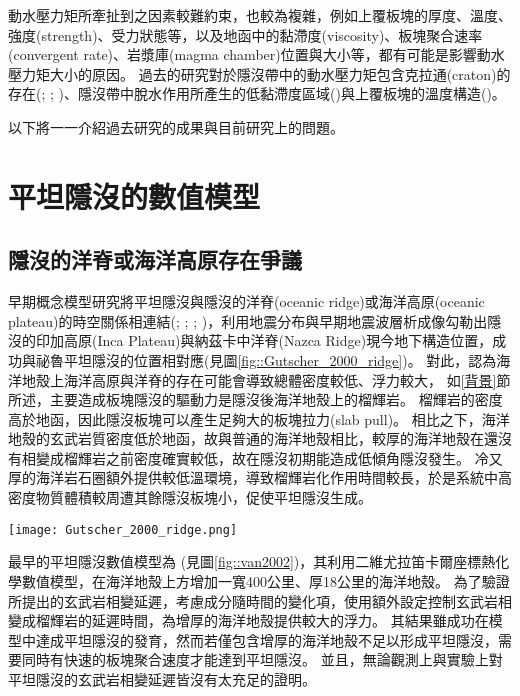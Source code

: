 動水壓力矩所牽扯到之因素較難約束，也較為複雜，例如上覆板塊的厚度、溫度、強度(strength)、受力狀態等，以及地函中的黏滯度(viscosity)、板塊聚合速率(convergent rate)、岩漿庫(magma chamber)位置與大小等，都有可能是影響動水壓力矩大小的原因。
過去的研究對於隱沒帶中的動水壓力矩包含克拉通(craton)的存在(\citealp{Manea2012Chile}; \citealp{Liu2016}; \citealp{Hu2016})、隱沒帶中脫水作用所產生的低黏滯度區域(\citealp{Manea2007})與上覆板塊的溫度構造(\citealp{Thermal2012})。

以下將一一介紹過去研究的成果與目前研究上的問題。

\section{平坦隱沒的數值模型}\label{平坦隱沒的數值模型}
\subsection{隱沒的洋脊或海洋高原存在爭議}\label{隱沒的洋脊或海洋高原存在爭議}
早期概念模型研究將平坦隱沒與隱沒的洋脊(oceanic ridge)或海洋高原(oceanic plateau)的時空關係相連結(\citealp{pilger1981plate}; \citealp{henderson1984mesozoic}; \citealp{Gutscher2000A}; \citealp{gutscher2002andean})，\citealp{Gutscher2000A}利用地震分布與早期地震波層析成像勾勒出隱沒的印加高原(Inca Plateau)與納茲卡中洋脊(Nazca Ridge)現今地下構造位置，成功與祕魯平坦隱沒的位置相對應(見圖\ref{fig::Gutscher_2000_ridge})。
對此，\citealp{Gutscher2000A}認為海洋地殼上海洋高原與洋脊的存在可能會導致總體密度較低、浮力較大，
如\ref{背景}節所述，主要造成板塊隱沒的驅動力是隱沒後海洋地殼上的榴輝岩。
榴輝岩的密度高於地函，因此隱沒板塊可以產生足夠大的板塊拉力(slab pull)。
相比之下，海洋地殼的玄武岩質密度低於地函，故與普通的海洋地殼相比，較厚的海洋地殼在還沒有相變成榴輝岩之前密度確實較低，故在隱沒初期能造成低傾角隱沒發生。
冷又厚的海洋岩石圈額外提供較低溫環境，導致榴輝岩化作用時間較長，於是系統中高密度物質體積較周遭其餘隱沒板塊小，促使平坦隱沒生成。

\begin{figure*}[htp]
    \centering
    \texttt{[image: Gutscher\_2000\_ridge.png]}
    \caption[南美洲板塊構造圖，摘自\citealp{Gutscher2000A}]{南美洲板塊構造圖，摘自\citealp{Gutscher2000A}。粗黑線標出平坦隱沒段，灰色陰影區標示隱沒的海洋高原與洋脊，三角形為活動火山。板塊聚合速率由白色箭頭標出，數值參考自\citealp{demets1990current}。
    }
    \label{fig::Gutscher_2000_ridge}
\end{figure*}

最早的平坦隱沒數值模型為\citealp{van2002role} (見圖\ref{fig::van2002})，其利用二維尤拉笛卡爾座標熱化學數值模型，在海洋地殼上方增加一寬400公里、厚18公里的海洋地殼。
為了驗證\citealp{Gutscher2000A}所提出的玄武岩相變延遲，\citealp{van2002role}考慮成分隨時間的變化項，使用額外設定控制玄武岩相變成榴輝岩的延遲時間，為增厚的海洋地殼提供較大的浮力。
其結果雖成功在模型中達成平坦隱沒的發育，然而若僅包含增厚的海洋地殼不足以形成平坦隱沒，需要同時有快速的板塊聚合速度才能達到平坦隱沒。
並且，無論觀測上與實驗上對平坦隱沒的玄武岩相變延遲皆沒有太充足的證明。

